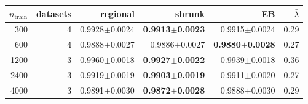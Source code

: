 \begin{tabular}{rrrrrr}
\toprule
$n_{\text{train}}$ & datasets & regional & shrunk & EB & $\bar\lambda$ \\
\midrule
300 & 4 & 0.9928$\pm$0.0024 & \textbf{0.9913$\pm$0.0023} & 0.9915$\pm$0.0024 & 0.29 \\
600 & 4 & 0.9888$\pm$0.0027 & 0.9886$\pm$0.0027 & \textbf{0.9880$\pm$0.0028} & 0.27 \\
1200 & 3 & 0.9960$\pm$0.0018 & \textbf{0.9927$\pm$0.0022} & 0.9939$\pm$0.0018 & 0.36 \\
2400 & 3 & 0.9919$\pm$0.0019 & \textbf{0.9903$\pm$0.0019} & 0.9911$\pm$0.0020 & 0.27 \\
4000 & 3 & 0.9891$\pm$0.0030 & \textbf{0.9872$\pm$0.0028} & 0.9888$\pm$0.0030 & 0.29 \\
\bottomrule
\end{tabular}
